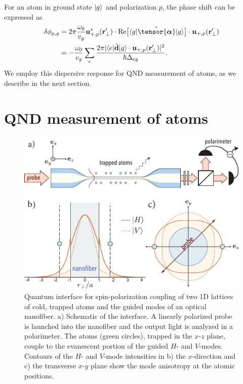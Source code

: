 \documentclass[aps,pra,twocolumn]{revtex4-1} %
\begin{document}
For an atom in ground state $\lvert{g}\rangle$ and polarization $p$, the phase shift can be expressed as \cite{le_kien_propagation_2014}
	\begin{align} \label{Eq::PhaseShiftMultilevel}
		\delta  \phi_{p,g} &=2\pi \frac{ \omega_{0}}{v_g} \mathbf{u}^*_{+, p}(\br'_\perp) \cdot {\rm Re}\big[\bra{g} 
\hat{\tensor{\boldsymbol{\alpha}}} \ket{g} \big] \cdot \mathbf{u}_{+, p}(\br'_\perp) \nn\\
&= - \frac{ \omega_{0} }{v_g} \sum_e \frac{2 \pi |\bra{e}\hat{\mathbf{d}}\ket{g} \cdot \mathbf{u}_{+,p}(\br'_\perp)|^2}{ \hbar  \Delta_{eg} } .
	\end{align}
We employ this dispersive response for QND measurement of atoms, as we describe in the next section.



\section{QND measurement of atoms} \label{Sec::QNDMeasurement}

\begin{figure}[t]
\includegraphics[scale=1]{./Fig2}
\caption{Quantum interface for spin-polarization coupling of two 1D lattices of cold, trapped atoms and the guided modes of an optical nanofiber. a) Schematic of the interface.  A linearly polarized probe is launched into the nanofiber and the output light is analyzed in a polarimeter.  The atoms (green circles), trapped in the $x$-$z$ plane, couple to the evanescent portion of the guided $H$- and $V$-modes.  Contours of the $H$- and $V$-mode intensities in b) the $x$-direction and c) the transverse $x$-$y$ plane show the mode anisotropy at the atomic positions. }\label{Fig::Schematic}
\end{figure}
\end{document}
